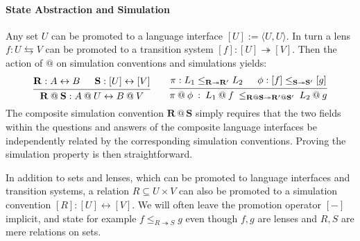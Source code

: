 \documentclass[acmsmall,screen,review,anonymous]{acmart}
\newcommand{\lensarrow}{\leftrightarrows}
\begin{document}

\paragraph{State Abstraction and Simulation} %

Any set $U$ can be promoted to a language interface
$[U] := \langle U, U \rangle$.
In turn a lens $f : U \lensarrow V$ can be promoted to a transition system
$[f] : [U] \twoheadrightarrow [V]$.
Then the action of $\mathbin@$ on
simulation conventions and simulations
yields:
\[
  \begin{prooftree}
    \hypo{\mathbf{R} : A \leftrightarrow B}
    \hypo{\mathbf{S} : [U] \leftrightarrow [V]}
    \infer2{\mathbf{R} \mathbin@ \mathbf{S}
      : A \mathbin@ U \leftrightarrow B \mathbin@ V}
  \end{prooftree}
  \qquad
  \begin{prooftree}
    \hypo{\pi : L_1 \le_{\mathbf{R} \twoheadrightarrow \mathbf{R'}} L_2}
    \hypo{\phi : [f] \le_{\mathbf{S} \twoheadrightarrow \mathbf{S'}} [g]}
    \infer2{\pi \mathbin@ \phi \: : \:
      L_1 \mathbin@ f \:
      \le_{\mathbf{R} \mathbin@ \mathbf{S} \twoheadrightarrow
           \mathbf{R'} \mathbin@ \mathbf{S'}} \:
      L_2 \mathbin@ g}
  \end{prooftree}
\]
The composite simulation convention $\mathbf{R} \mathbin@ \mathbf{S}$
simply requires that the two fields within the questions and answers
of the composite language interfaces
be independently related by the corresponding simulation conventions.
Proving the simulation property is then straightforward.

In addition to sets and lenses,
which can be promoted to language interfaces and transition systems,
a relation $R \subseteq U \times V$ can also be promoted to
a simulation convention $[R] : [U] \leftrightarrow [V]$.
We will often leave the promotion operator $[-]$ implicit,
and state for example $f \le_{R \twoheadrightarrow S} g$
even though $f, g$ are lenses and
$R, S$ are mere relations on sets.

\end{document}
